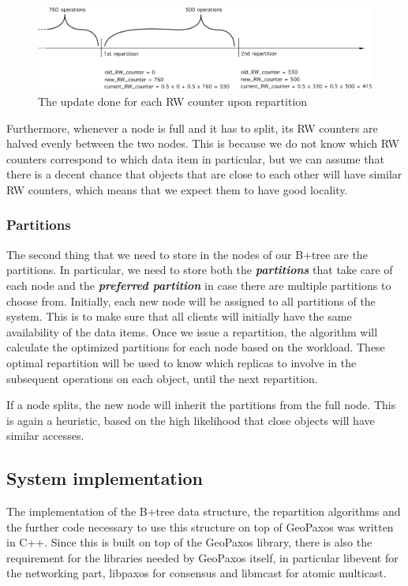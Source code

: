 \begin{figure}[!htb]
  \centering
  \includegraphics[width=\textwidth,height=\textheight,keepaspectratio]{img/RW_counters.png}
  \caption{ The update done for each RW counter upon repartition }
  \label{fig:RW counters}
\end{figure}

Furthermore, whenever a node is full and it has to split, its RW counters are halved evenly between the two nodes. This is because we do not know which RW counters correspond to which data item in particular, but we can assume that there is a decent chance that objects that are close to each other will have similar RW counters, which means that we expect them to have good locality.

\subsubsection{Partitions}
The second thing that we need to store in the nodes of our B+tree are the partitions. In particular, we need to store both the \textbf{\emph{partitions}} that take care of each node and the \textbf{\emph{preferred partition}} in case there are multiple partitions to choose from. Initially, each new node will be assigned to all partitions of the system. This is to make sure that all clients will initially have the same availability of the data items. Once we issue a repartition, the algorithm will calculate the optimized partitions for each node based on the workload. These optimal repartition will be used to know which replicas to involve in the subsequent operations on each object, until the next repartition.

If a node splits, the new node will inherit the partitions from the full node. This is again a heuristic, based on the high likelihood that close objects will have similar accesses.

\subsection{System implementation}\label{sec:system-implementation}
The implementation of the B+tree data structure, the repartition algorithms and the further code necessary to use this structure on top of GeoPaxos was written in C++. Since this is built on top of the GeoPaxos library, there is also the requirement for the libraries needed by GeoPaxos itself, in particular libevent \citep{libevent} for the networking part, libpaxos for consensus \citep{libpaxos} and libmcast \citep{libmcast} for atomic multicast.

